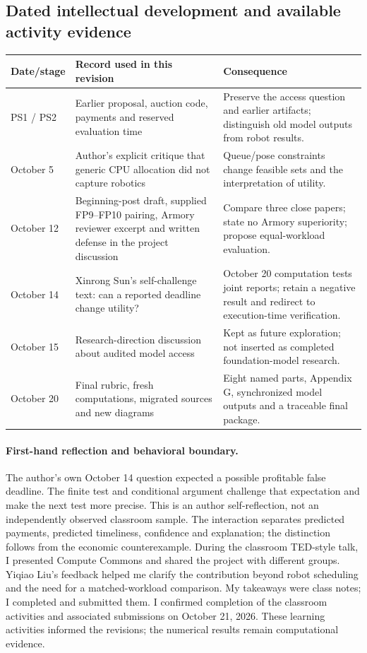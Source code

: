 \subsection{Dated intellectual development and available activity evidence}
\noindent\begin{tabularx}{\textwidth}{p{}YY}\toprule
Date/stage & Record used in this revision & Consequence\\\midrule
PS1 / PS2 & Earlier proposal, auction code, payments and reserved evaluation time & Preserve the access question and earlier artifacts; distinguish old model outputs from robot results.\\
October 5 & Author's explicit critique that generic CPU allocation did not capture robotics & Queue/pose constraints change feasible sets and the interpretation of utility.\\
October 12 & Beginning-post draft, supplied FP9--FP10 pairing, Armory reviewer excerpt and written defense in the project discussion & Compare three close papers; state no Armory superiority; propose equal-workload evaluation.\\
October 14 & Xinrong Sun's self-challenge text: can a reported deadline change utility? & October 20 computation tests joint reports; retain a negative result and redirect to execution-time verification.\\
October 15 & Research-direction discussion about audited model access & Kept as future exploration; not inserted as completed foundation-model research.\\
October 20 & Final rubric, fresh computations, migrated sources and new diagrams & Eight named parts, Appendix G, synchronized model outputs and a traceable final package.\\\bottomrule
\end{tabularx}
\paragraph{First-hand reflection and behavioral boundary.} The author's own October 14 question expected a possible profitable false deadline. The finite test and conditional argument challenge that expectation and make the next test more precise. This is an author self-reflection, not an independently observed classroom sample. The interaction separates predicted payments, predicted timeliness, confidence and explanation; the distinction follows from the economic counterexample. During the classroom TED-style talk, I presented Compute Commons and shared the project with different groups. Yiqiao Liu's feedback helped me clarify the contribution beyond robot scheduling and the need for a matched-workload comparison. My takeaways were class notes; I completed and submitted them. I confirmed completion of the classroom activities and associated submissions on October 21, 2026. These learning activities informed the revisions; the numerical results remain computational evidence.
